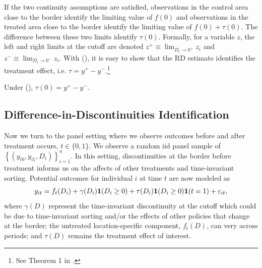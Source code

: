 \documentclass[12pt]{article}
\begin{document}
If the two continuity assumptions are satisfied, observations in the control area close to the border identify the limiting value of $f(0)$ and observations in the treated area close to the border identify the limiting value of $f(0) + \tau(0)$. The difference between these two limits identify $\tau(0)$. Formally, for a variable $z$, the left and right limits at the cutoff are denoted $z^+ \equiv \lim_{D_i \to 0^+} z_i$ and $z^- \equiv \lim_{D_i \to 0^-} z_i$. With (), it is easy to show that the RD estimate identifies the treatment effect, i.e. $\tau = y^+ - y^-$.\footnote{See Theorem 1 in \citet{Hahn_Todd_Klaauw_2001}.} 

\begin{theorem}[RD Identification]
    Under (), $\tau(0) = y^+ - y^-$.
\end{theorem}



\subsection{Difference-in-Discontinuities Identification}

Now we turn to the panel setting where we observe outcomes before and after treatment occurs, $t \in \{0,1\}$. We observe a random iid panel sample of $\left\{ (y_{i0}, y_{i1}, D_i) \right\}_{i=1}^n$. In this setting, discontinuities at the border before treatment informs us on the affects of other treatments and time-invariant sorting. Potential outcomes for individual $i$ at time $t$ are now modeled as 
\begin{equation}\label{eq:panel_model}
    y_{it} = f_t(D_i) + \gamma(D_i) \mathbf{1}(D_i \geq 0) + \tau(D_i) \mathbf{1}(D_i \geq 0) \mathbf{1}(t = 1) + \varepsilon_{it},
\end{equation}
where $\gamma(D)$ represent the time-invariant discontinuity at the cutoff which could be due to time-invariant sorting and/or the effects of other policies that change at the border; the untreated location-specific component, $f_t(D)$, can very across periods; and $\tau(D)$ remains the treatment effect of interest. 
\end{document}
